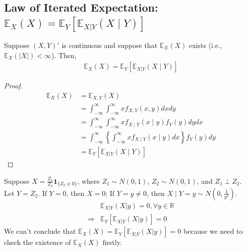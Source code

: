 \documentclass[11pt]{elegantbook}
\begin{document}
\subsection{Law of Iterated Expectation: $\mathbb{E}_X(X)=\mathbb{E}_Y[\mathbb{E}_{X|Y}(X\mid Y)]$}
\begin{theorem}
    Suppose $(X,Y)'$ is continuous and suppose that $\mathbb{E}_X(X)$ exists (i.e., $\mathbb{E}_X(|X|)<\infty$). Then,
    \begin{equation}
        \begin{aligned}
            \mathbb{E}_X(X)=\mathbb{E}_Y[\mathbb{E}_{X|Y}(X\mid Y)]
        \end{aligned}
        \nonumber
    \end{equation}
\end{theorem}
\begin{proof}
    \begin{equation}
        \begin{aligned}
            \mathbb{E}_X(X)&=\mathbb{E}_{X,Y}(X)\\
            &=\int_{-\infty}^\infty\int_{-\infty}^\infty x f_{X,Y}(x,y) dx dy\\
            &=\int_{-\infty}^\infty\int_{-\infty}^\infty x f_{X\mid Y}(x\mid y) f_Y(y) dy dx\\
            &=\int_{-\infty}^\infty\left\{\int_{-\infty}^\infty x f_{X\mid Y}(x\mid y)dx\right\} f_Y(y) dy \\
            &=\mathbb{E}_Y[\mathbb{E}_{X|Y}(X\mid Y)]
        \end{aligned}
        \nonumber
    \end{equation}
\end{proof}

\begin{example}
    Suppose $X=\frac{Z_1}{Z_2} \mathbf{1}_{\{Z_2\neq 0\}}$, where $Z_1\sim N(0,1)$, $Z_2\sim N(0,1)$, and $Z_1\perp Z_2$.\\
    Let $Y=Z_2$. If $Y=0$, then $X=0$; If $Y=y\neq 0$, then $X\mid Y=y\sim N(0,\frac{1}{y^2})$.
    \begin{equation}
        \begin{aligned}
            &\mathbb{E}_{X|Y}(X|y)=0,\forall y\in \mathbb{R}\\
            \Rightarrow &\mathbb{E}_Y[\mathbb{E}_{X|Y}(X|y)]=0
        \end{aligned}
        \nonumber
    \end{equation}
    We can't conclude that $\mathbb{E}_X(X)=\mathbb{E}_Y[\mathbb{E}_{X|Y}(X|y)]=0$ because we need to check the existence of $\mathbb{E}_X(X)$ firstly.
\end{example}
\end{document}
